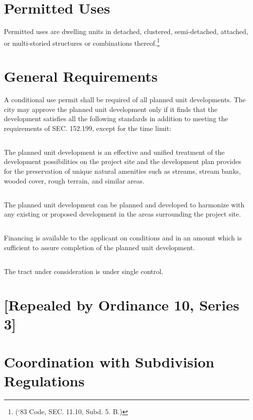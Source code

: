 \section{Permitted Uses}
Permitted uses are dwelling units in detached, clustered, semi-detached, attached, or multi-storied structures or combinations thereof.\footnote{(‘83 Code, SEC. 11.10, Subd. 5. B.)}
\section{General Requirements}
A conditional use permit shall be required of all planned unit developments. The city may approve the planned unit development only if it finds that the development satisfies all the following standards in addition to meeting the requirements of SEC. 152.199, except for the time limit:
\subsection{}
The planned unit development is an effective and unified treatment of the development possibilities on the project site and the development plan provides for the preservation of unique natural amenities such as streams, stream banks, wooded cover, rough terrain, and similar areas.
\subsection{}
The planned unit development can be planned and developed to harmonize with any existing or proposed development in the areas surrounding the project site.
\subsection{}
Financing is available to the applicant on conditions and in an amount which is sufficient to assure completion of the planned unit development.
\subsection{}
The tract under consideration is under single control.


\section{[Repealed by Ordinance 10, Series 3]}
\section{Coordination with Subdivision Regulations}
